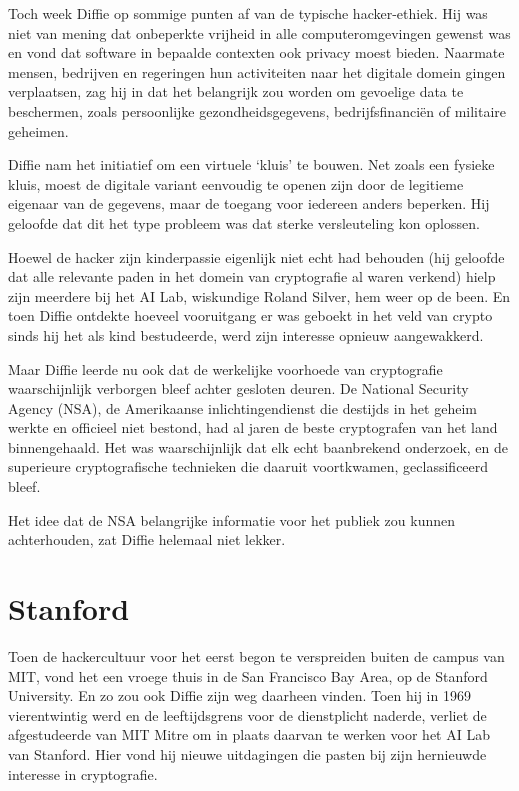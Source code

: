 \documentclass[smalldemyvopaper,11pt,twoside,onecolumn,openright,extrafontsizes,hidelinks]{memoir}
\begin{document}
Toch week Diffie op sommige punten af van de typische hacker-ethiek. Hij
was niet van mening dat onbeperkte vrijheid in alle computeromgevingen
gewenst was en vond dat software in bepaalde contexten ook privacy moest
bieden. Naarmate mensen, bedrijven en regeringen hun activiteiten naar
het digitale domein gingen verplaatsen, zag hij in dat het belangrijk
zou worden om gevoelige data te beschermen, zoals persoonlijke
gezondheidsgegevens, bedrijfsfinanciën of militaire geheimen.

Diffie nam het initiatief om een virtuele `kluis' te bouwen. Net zoals
een fysieke kluis, moest de digitale variant eenvoudig te openen zijn
door de legitieme eigenaar van de gegevens, maar de toegang voor
iedereen anders beperken. Hij geloofde dat dit het type probleem was dat
sterke versleuteling kon oplossen.

Hoewel de hacker zijn kinderpassie eigenlijk niet echt had behouden (hij
geloofde dat alle relevante paden in het domein van cryptografie al
waren verkend) hielp zijn meerdere bij het AI Lab, wiskundige Roland
Silver, hem weer op de been. En toen Diffie ontdekte hoeveel vooruitgang
er was geboekt in het veld van crypto sinds hij het als kind
bestudeerde, werd zijn interesse opnieuw aangewakkerd.

Maar Diffie leerde nu ook dat de werkelijke voorhoede van cryptografie
waarschijnlijk verborgen bleef achter gesloten deuren. De National
Security Agency (NSA), de Amerikaanse inlichtingendienst die destijds in
het geheim werkte en officieel niet bestond, had al jaren de beste
cryptografen van het land binnengehaald. Het was waarschijnlijk dat elk
echt baanbrekend onderzoek, en de superieure cryptografische technieken
die daaruit voortkwamen, geclassificeerd bleef.

Het idee dat de NSA belangrijke informatie voor het publiek zou kunnen
achterhouden, zat Diffie helemaal niet lekker.

\section{Stanford}\label{stanford}

Toen de hackercultuur voor het eerst begon te verspreiden buiten de
campus van MIT, vond het een vroege thuis in de San Francisco Bay Area,
op de Stanford University. En zo zou ook Diffie zijn weg daarheen
vinden. Toen hij in 1969 vierentwintig werd en de leeftijdsgrens voor de
dienstplicht naderde, verliet de afgestudeerde van MIT Mitre om in
plaats daarvan te werken voor het AI Lab van Stanford. Hier vond hij
nieuwe uitdagingen die pasten bij zijn hernieuwde interesse in
cryptografie.
\end{document}
